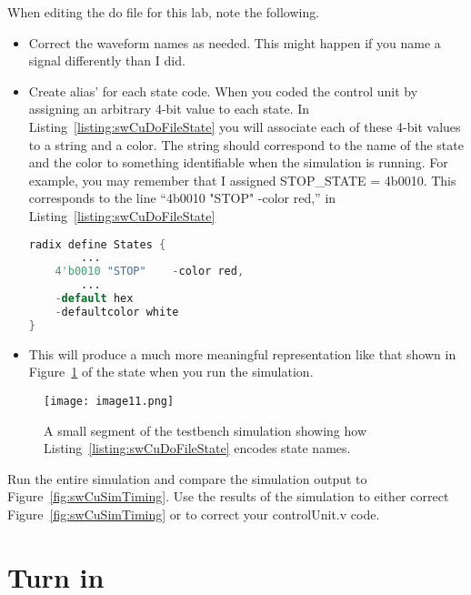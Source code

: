 When editing the do file for this lab, note the following.

\begin{itemize}
\item
  Correct the waveform names as needed. This might happen if you name a
  signal differently than I did.
\item
  Create alias' for each state code. When you coded the control unit by
  assigning an arbitrary 4-bit value to each state. In Listing~\ref{listing:swCuDoFileState} you
  will associate each of these 4-bit values to a string and a color. The
  string should correspond to the name of the state and the color to
  something identifiable when the simulation is running. For example,
  you may remember that I assigned STOP\_STATE =
  4\textquotesingle b0010. This corresponds to the line
  ``4\textquotesingle b0010 "STOP" -color red,'' in Listing~\ref{listing:swCuDoFileState}
  
  
  \begin{lstlisting}[language=Verilog,
 caption={Creating alias' for the binary codes of states in the do file uses requires knowing the binary code of each state, the name of each state and the color for each state.},
 label={listing:swCuDoFileState},
 frame=single]
 radix define States {
		...
	4'b0010 "STOP"    -color red,
		...
	-default hex
	-defaultcolor white
}
 \end{lstlisting}
  
\item
  This will produce a much more meaningful representation like that
  shown in Figure~\ref{fig:swCuTestbenchTiming} of the state when you run the simulation.
\end{itemize}

\begin{figure}[ht]
\texttt{[image: image11.png]}
\caption{A small segment of the testbench simulation showing how
Listing~\ref{listing:swCuDoFileState} encodes state names.}
\label{fig:swCuTestbenchTiming}
\end{figure}

Run the entire simulation and compare the simulation output to Figure~\ref{fig:swCuSimTiming}. 
Use the results of the simulation to either correct Figure~\ref{fig:swCuSimTiming} or 
to correct your controlUnit.v code.

\section{Turn in}

